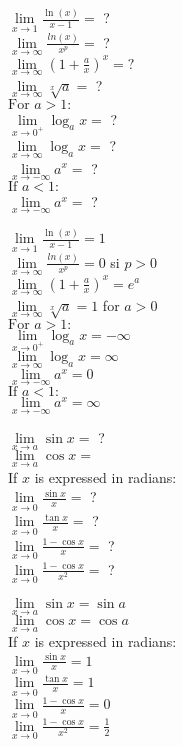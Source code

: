 \documentclass[12pt]{article}
\newcommand*{\xfield}[1]{\begin{mdframed}\centering #1\end{mdframed}\bigskip}
\newenvironment{note}{}{}
\begin{document}
\begin{note}
    \xfield{$\lim\limits_{x\to1}\frac{\ln(x)}{x-1}=$ ?\\$\lim\limits_{x\to \infty} \frac{ln(x)}{x^p}= $ ?\\$\lim\limits_{x \to \infty}(1+\frac{a}{x})^x = ?$\\$\lim\limits_{x \to \infty} \sqrt[x]{a} =$ ?\\$\mbox{For } a > 1: \,$\\$\lim\limits_{x \to 0^+} \log_a x = $ ?\\$\lim\limits_{x \to \infty} \log_a x = $ ?\\$\lim\limits_{x \to -\infty} a^x = $ ?\\$\mbox{If } a < 1: \,$\\$\lim\limits_{x \to -\infty} a^x =$ ?}
    \xfield{$\lim\limits_{x\to1}\frac{\ln(x)}{x-1}=1$\\$\lim\limits_{x\to \infty} \frac{ln(x)}{x^p}= 0$ si $p>0$\\$\lim\limits_{x \to \infty}(1+\frac{a}{x})^x = e^a$\\$\lim\limits_{x \to \infty} \sqrt[x]{a} = 1$ for $a > 0$\\$\mbox{For } a > 1: \,$\\$\lim\limits_{x \to 0^+} \log_a x = -\infty$\\$\lim\limits_{x \to \infty} \log_a x = \infty$\\$\lim\limits_{x \to -\infty} a^x = 0$\\$\mbox{If } a < 1: \,$\\$\lim\limits_{x \to -\infty} a^x = \infty$}
\end{note}

\begin{note}
    \xfield{$\lim\limits_{x \to a} \sin x =$ ?\\$\lim\limits_{x \to a} \cos x =$\\If $x$ is expressed in radians:\\$\lim\limits_{x \to 0} \frac{\sin x}{x} =$ ?\\$\lim\limits_{x \to 0} \frac{\tan x}{x} = $ ?\\$\lim\limits_{x \to 0} \frac{1-\cos x}{x} =$ ?\\$\lim\limits_{x \to 0} \frac{1-\cos x}{x^2} =$ ?}
    \xfield{$\lim\limits_{x \to a} \sin x = \sin a$\\$\lim\limits_{x \to a} \cos x = \cos a$\\If $x$ is expressed in radians:\\$\lim\limits_{x \to 0} \frac{\sin x}{x} = 1$\\$\lim\limits_{x \to 0} \frac{\tan x}{x} = 1$\\$\lim\limits_{x \to 0} \frac{1-\cos x}{x} = 0$\\$\lim\limits_{x \to 0} \frac{1-\cos x}{x^2} = \frac{1}{2}$}
\end{note}
\end{document}
